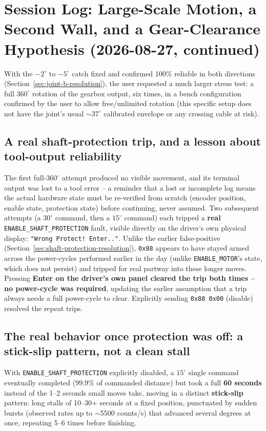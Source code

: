 \documentclass[11pt,letterpaper]{article}
\begin{document}
\section{Session Log: Large-Scale Motion, a Second Wall, and a Gear-Clearance Hypothesis (2026-08-27, continued)}
\label{sec:session-2026-08-27-large-scale}
With the $-2^\circ$ to $-5^\circ$ catch fixed and confirmed 100\% reliable in both directions (Section~\ref{sec:joint-b-resolution}), the user requested a much larger stress test: a full $360^\circ$ rotation of the gearbox output, six times, in a bench configuration confirmed by the user to allow free/unlimited rotation (this specific setup does not have the joint's usual $\sim$$37^\circ$ calibrated envelope or any crossing cable at risk).

\subsection{A real shaft-protection trip, and a lesson about tool-output reliability}
The first full-$360^\circ$ attempt produced no visible movement, and its terminal output was lost to a tool error -- a reminder that a lost or incomplete log means the actual hardware state must be re-verified from scratch (encoder position, enable state, protection state) before continuing, never assumed. Two subsequent attempts (a $30^\circ$ command, then a $15^\circ$ command) each tripped a \textbf{real} \texttt{ENABLE\_SHAFT\_PROTECTION} fault, visible directly on the driver's own physical display: \texttt{"Wrong Protect! Enter.."}. Unlike the earlier false-positive (Section~\ref{sec:shaft-protection-resolution}), \texttt{0x88} appears to have stayed armed across the power-cycles performed earlier in the day (unlike \texttt{ENABLE\_MOTOR}'s state, which does not persist) and tripped for real partway into these longer moves. Pressing \textbf{Enter on the driver's own panel cleared the trip both times -- no power-cycle was required}, updating the earlier assumption that a trip always needs a full power-cycle to clear. Explicitly sending \texttt{0x88 0x00} (disable) resolved the repeat trips.

\subsection{The real behavior once protection was off: a stick-slip pattern, not a clean stall}
With \texttt{ENABLE\_SHAFT\_PROTECTION} explicitly disabled, a $15^\circ$ single command eventually completed ($99.9\%$ of commanded distance) but took a full \textbf{60 seconds} instead of the 1--2 seconds small moves take, moving in a distinct \textbf{stick-slip} pattern: long stalls of 10--30+ seconds at a fixed position, punctuated by sudden bursts (observed rates up to $\sim$5500 counts/s) that advanced several degrees at once, repeating 5--6 times before finishing.
\end{document}
